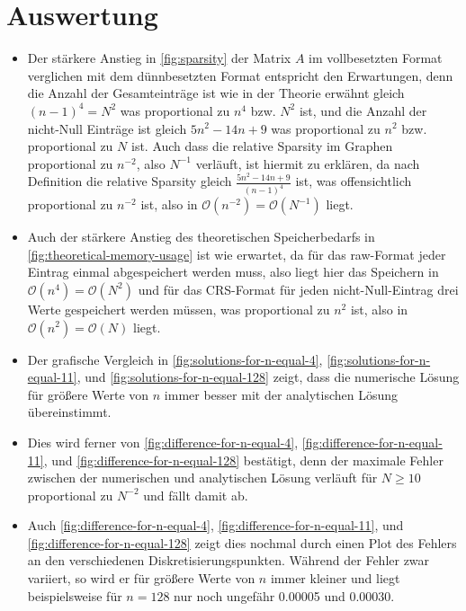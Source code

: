 \documentclass{scrartcl}
\newcommand\BigO{\mathcal{O}}
\begin{document}
\section{Auswertung}

\begin{itemize}
    \item Der stärkere Anstieg in \autoref{fig:sparsity} der Matrix \(A\) im
          vollbesetzten Format verglichen mit dem dünnbesetzten Format entspricht den
          Erwartungen, denn die Anzahl der Gesamteinträge ist wie in der
          Theorie erwähnt gleich \({(n - 1)}^4 = N^2\) was proportional zu \(n^4\) 
          bzw. \(N^2\) ist, und die Anzahl der nicht-Null Einträge ist gleich \(5n^2 - 14n +
          9\) was proportional zu \(n^2\) bzw. proportional zu \(N\) ist. Auch dass die relative Sparsity
          im Graphen proportional zu \(n^{-2}\), also \(N^{-1}\) verläuft, ist hiermit zu
          erklären, da nach Definition die relative Sparsity gleich
          \(\frac{5n^2 - 14n + 9}{{(n - 1)}^4}\) ist, was offensichtlich
          proportional zu \(n^{-2}\) ist, also in \(\BigO(n^{-2}) = \BigO(N^{-1})\) liegt.

    \item Auch der stärkere Anstieg des theoretischen Speicherbedarfs in
          \autoref{fig:theoretical-memory-usage} ist wie erwartet, da für das
          raw-Format jeder Eintrag einmal abgespeichert werden muss, also liegt
          hier das Speichern in \(\BigO(n^4) = \BigO(N^2)\) und für das CRS-Format für jeden
          nicht-Null-Eintrag drei Werte gespeichert werden müssen, was
          proportional zu \(n^2\) ist, also in \(\BigO(n^2) = \BigO(N)\) liegt.

    \item Der grafische Vergleich in \autoref{fig:solutions-for-n-equal-4},
          \autoref{fig:solutions-for-n-equal-11}, und
          \autoref{fig:solutions-for-n-equal-128} zeigt, dass die numerische
          Lösung für größere Werte von \(n\) immer besser mit der analytischen
          Lösung übereinstimmt.

    \item Dies wird ferner von \autoref{fig:difference-for-n-equal-4},
          \autoref{fig:difference-for-n-equal-11}, und
          \autoref{fig:difference-for-n-equal-128} bestätigt, denn der maximale
          Fehler zwischen der numerischen und analytischen Lösung verläuft für
          \(N \geqslant 10\) proportional zu \(N^{-2}\) und fällt damit ab.

    \item Auch \autoref{fig:difference-for-n-equal-4},
          \autoref{fig:difference-for-n-equal-11}, und
          \autoref{fig:difference-for-n-equal-128} zeigt dies nochmal durch
          einen Plot des Fehlers an den verschiedenen Diskretisierungspunkten.
          Während der Fehler zwar variiert, so wird er für größere Werte von
          \(n\) immer kleiner und liegt beispielsweise für \(n = 128\) nur noch
          ungefähr 0.00005 und 0.00030.


\end{itemize}
\end{document}
